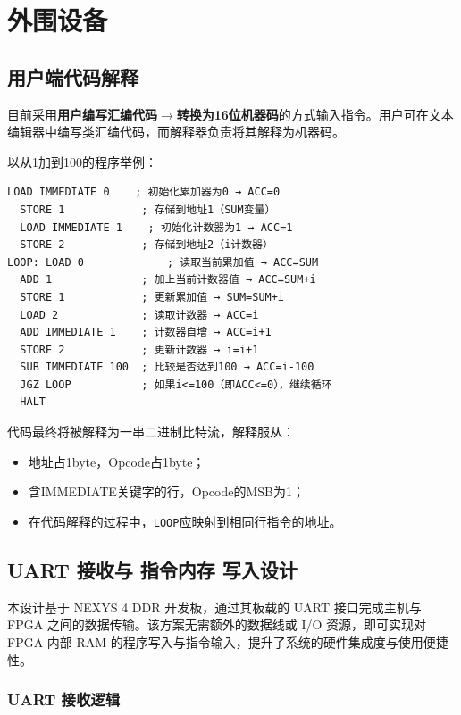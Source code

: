 \documentclass[lang=cn,a4paper,newtx]{elegantpaper}
\begin{document}
\section{外围设备}
\subsection{用户端代码解释}
目前采用\textbf{用户编写汇编代码}$\to$\textbf{转换为16位机器码}的方式输入指令。用户可在文本编辑器中编写类汇编代码，而解释器负责将其解释为机器码。

以从1加到100的程序举例：
\begin{lstlisting}[language=Assembly]
  LOAD IMMEDIATE 0    ; 初始化累加器为0 → ACC=0
  STORE 1            ; 存储到地址1（SUM变量）
  LOAD IMMEDIATE 1    ; 初始化计数器为1 → ACC=1
  STORE 2            ; 存储到地址2（i计数器）
LOOP: LOAD 0             ; 读取当前累加值 → ACC=SUM
  ADD 1              ; 加上当前计数器值 → ACC=SUM+i
  STORE 1            ; 更新累加值 → SUM=SUM+i
  LOAD 2             ; 读取计数器 → ACC=i
  ADD IMMEDIATE 1    ; 计数器自增 → ACC=i+1
  STORE 2            ; 更新计数器 → i=i+1
  SUB IMMEDIATE 100  ; 比较是否达到100 → ACC=i-100
  JGZ LOOP           ; 如果i<=100（即ACC<=0），继续循环
  HALT
\end{lstlisting}

代码最终将被解释为一串二进制比特流，解释服从：
\begin{itemize}
  \item 地址占1byte，Opcode占1byte；
  \item 含IMMEDIATE关键字的行，Opcode的MSB为1；
  \item 在代码解释的过程中，\texttt{LOOP}应映射到相同行指令的地址。
\end{itemize}



\subsection{UART 接收与 指令内存 写入设计}

本设计基于 NEXYS 4 DDR 开发板，通过其板载的 UART 接口完成主机与 FPGA 之间的数据传输。该方案无需额外的数据线或 I/O 资源，即可实现对 FPGA 内部 RAM 的程序写入与指令输入，提升了系统的硬件集成度与使用便捷性。

\subsubsection{UART 接收逻辑}
\end{document}
